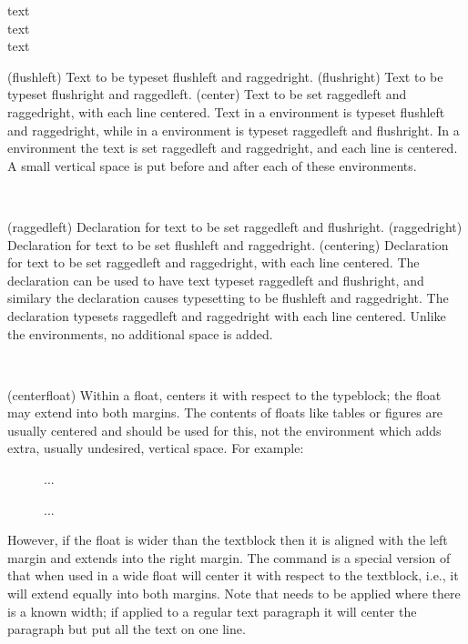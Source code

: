 \begin{syntax}
 text  \\
 text  \\
 text  \\
\end{syntax}
\glossary(flushleft)%
  {}%
  {Text to be typeset flushleft and raggedright.}
\glossary(flushright)%
  {}%
  {Text to be typeset flushright and raggedleft.}
\glossary(center)%
  {}%
  {Text to be set raggedleft and raggedright, with each line centered.}
    Text in a  environment is typeset flushleft and raggedright,
while in a  environment is typeset raggedleft and flushright.
In a  environment the text is set raggedleft and raggedright, 
and each line is centered. A small vertical space is put before and after 
each of these environments.

\begin{syntax}
\cmd{\raggedleft} \cmd{\raggedright} \cmd{\centering} \\
\end{syntax} 
\glossary(raggedleft)
  {}%
  {Declaration for text to be set raggedleft and flushright.}
\glossary(raggedright)
  {}%
  {Declaration for text to be set flushleft and raggedright.}
\glossary(centering)%
  {}%
  {Declaration for text to be set raggedleft and raggedright, 
   with each line centered.}
     The \cmd{\raggedleft} declaration can be used to have text typeset
raggedleft and flushright, and similary the declaration \cmd{\raggedright}
causes typesetting to be flushleft and raggedright. The declaration 
\cmd{\centering} typesets raggedleft and raggedright with each line centered.
Unlike the environments, no additional space is added. 

\begin{syntax}
\cmd{\centerfloat} \\
\end{syntax}
\glossary(centerfloat)%
  {}%
  {Within a float, centers it with respect to the typeblock; the float 
   may extend into both margins.}
The contents of floats like tables or figures are usually centered 
and \cmd{\centering}
should be used for this, not the  environment which adds extra,
usually undesired, vertical space. For example:
\begin{lcode}
\begin{figure}
\centering
...
\caption{...}
\end{figure}
\end{lcode} 
However, if the float is wider than the
textblock then it is aligned with the left margin and extends into the right
margin. The command \cmd{\centerfloat} is a special version of \cmd{\center}
that when used in a wide float will center it with respect to the textblock,
i.e., it will extend equally into both margins. Note that \cmd{\centerfloat}
needs to be applied where there is a known width; if applied to a regular
text paragraph it will center the paragraph but put all the text on one line.

